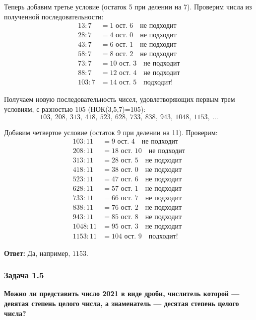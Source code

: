 \documentclass[12pt, a4paper]{article}
\begin{document}
Теперь добавим третье условие (остаток 5 при делении на 7). Проверим числа из полученной последовательности:
\begin{align*}
13 : 7 &= 1 \text{ ост. } 6 \quad \text{не подходит} \\
28 : 7 &= 4 \text{ ост. } 0 \quad \text{не подходит} \\
43 : 7 &= 6 \text{ ост. } 1 \quad \text{не подходит} \\
58 : 7 &= 8 \text{ ост. } 2 \quad \text{не подходит} \\
73 : 7 &= 10 \text{ ост. } 3 \quad \text{не подходит} \\
88 : 7 &= 12 \text{ ост. } 4 \quad \text{не подходит} \\
103 : 7 &= 14 \text{ ост. } 5 \quad \text{подходит!}
\end{align*}

Получаем новую последовательность чисел, удовлетворяющих первым трем условиям, с разностью $105$ (НОК(3,5,7)=105):
\[
103,\ 208,\ 313,\ 418,\ 523,\ 628,\ 733,\ 838,\ 943,\ 1048,\ 1153,\ \ldots
\]

Добавим четвертое условие (остаток 9 при делении на 11). Проверим:
\begin{align*}
103 : 11 &= 9 \text{ ост. } 4 \quad \text{не подходит} \\
208 : 11 &= 18 \text{ ост. } 10 \quad \text{не подходит} \\
313 : 11 &= 28 \text{ ост. } 5 \quad \text{не подходит} \\
418 : 11 &= 38 \text{ ост. } 0 \quad \text{не подходит} \\
523 : 11 &= 47 \text{ ост. } 6 \quad \text{не подходит} \\
628 : 11 &= 57 \text{ ост. } 1 \quad \text{не подходит} \\
733 : 11 &= 66 \text{ ост. } 7 \quad \text{не подходит} \\
838 : 11 &= 76 \text{ ост. } 2 \quad \text{не подходит} \\
943 : 11 &= 85 \text{ ост. } 8 \quad \text{не подходит} \\
1048 : 11 &= 95 \text{ ост. } 3 \quad \text{не подходит} \\
1153 : 11 &= 104 \text{ ост. } 9 \quad \text{подходит!}
\end{align*}

\textbf{Ответ:} Да, например, $1153$.

\subsubsection*{Задача 1.5}
\textbf{Можно ли представить число 2021 в виде дроби, числитель которой — девятая степень целого числа, а знаменатель — десятая степень целого числа?}
\end{document}

